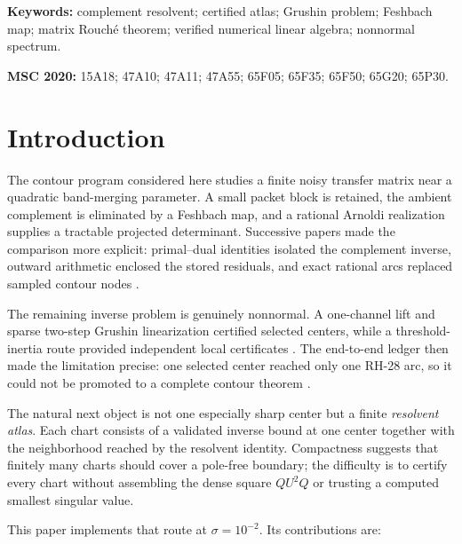 \documentclass[11pt]{article}
\theoremstyle{definition}
\theoremstyle{remark}
\begin{document}
\noindent\textbf{Keywords:} complement resolvent; certified atlas; Grushin
problem; Feshbach map; matrix Rouch\'e theorem; verified numerical linear
algebra; nonnormal spectrum.

\medskip
\noindent\textbf{MSC 2020:} 15A18; 47A10; 47A11; 47A55; 65F05; 65F35;
65F50; 65G20; 65P30.

\section{Introduction}
\label{sec:introduction}

The contour program considered here studies a finite noisy transfer matrix
near a quadratic band-merging parameter.  A small packet block is retained,
the ambient complement is eliminated by a Feshbach map, and a rational
Arnoldi realization supplies a tractable projected determinant.  Successive
papers made the comparison more explicit: primal--dual identities isolated
the complement inverse, outward arithmetic enclosed the stored residuals,
and exact rational arcs replaced sampled contour nodes
\citep{WangContourFeshbach2026,WangOutwardCode2026,WangArcwise2026}.

The remaining inverse problem is genuinely nonnormal.  A one-channel lift
and sparse two-step Grushin linearization certified selected centers, while a
threshold-inertia route provided independent local certificates
\citep{WangDeflated2026,WangSparseGrushin2026,WangThresholdInertia2026}.
The end-to-end ledger then made the limitation precise: one selected center
reached only one RH-28 arc, so it could not be promoted to a complete
contour theorem \citep{WangLedger2026}.

The natural next object is not one especially sharp center but a finite
\emph{resolvent atlas}.  Each chart consists of a validated inverse bound at
one center together with the neighborhood reached by the resolvent identity.
Compactness suggests that finitely many charts should cover a pole-free
boundary; the difficulty is to certify every chart without assembling the
dense square $QU^2Q$ or trusting a computed smallest singular value.

This paper implements that route at $\sigma=10^{-2}$.  Its contributions
are:
\end{document}
